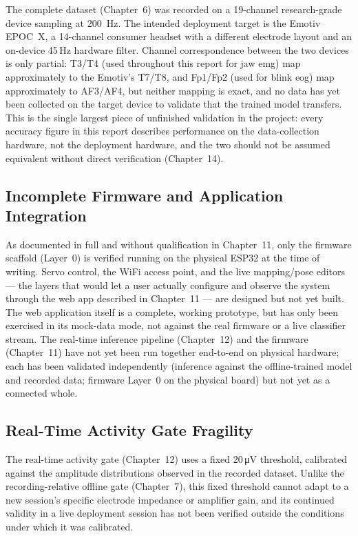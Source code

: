 The complete dataset (Chapter~6) was recorded on a 19-channel
research-grade device sampling at \SI{200}{\hertz}. The intended
deployment target is the Emotiv EPOC~X, a 14-channel consumer
headset with a different electrode layout and an on-device 45\,Hz
hardware filter. Channel correspondence between the two devices is
only partial: T3/T4 (used throughout this report for jaw
\acrshort{emg}) map approximately to the Emotiv's T7/T8, and Fp1/Fp2
(used for blink \acrshort{eog}) map approximately to AF3/AF4, but
neither mapping is exact, and no data has yet been collected on the
target device to validate that the trained model transfers. This is
the single largest piece of unfinished validation in the project:
every accuracy figure in this report describes performance on the
data-collection hardware, not the deployment hardware, and the two
should not be assumed equivalent without direct verification
(Chapter~14).

\subsection{Incomplete Firmware and Application Integration}

As documented in full and without qualification in Chapter~11, only
the firmware scaffold (Layer~0) is verified running on the physical
ESP32 at the time of writing. Servo control, the WiFi access point,
and the live mapping/pose editors --- the layers that would let a
user actually configure and observe the system through the web app
described in Chapter~11 --- are designed but not yet built. The web
application itself is a complete, working prototype, but has only
been exercised in its mock-data mode, not against the real firmware
or a live classifier stream. The real-time inference pipeline
(Chapter~12) and the firmware (Chapter~11) have not yet been run
together end-to-end on physical hardware; each has been validated
independently (inference against the offline-trained model and
recorded data; firmware Layer~0 on the physical board) but not yet
as a connected whole.

\subsection{Real-Time Activity Gate Fragility}

The real-time activity gate (Chapter~12) uses a fixed
20\,\si{\micro\volt} threshold, calibrated against the amplitude
distributions observed in the recorded dataset. Unlike the
recording-relative offline gate (Chapter~7), this fixed threshold
cannot adapt to a new session's specific electrode impedance or
amplifier gain, and its continued validity in a live deployment
session has not been verified outside the conditions under which it
was calibrated.


